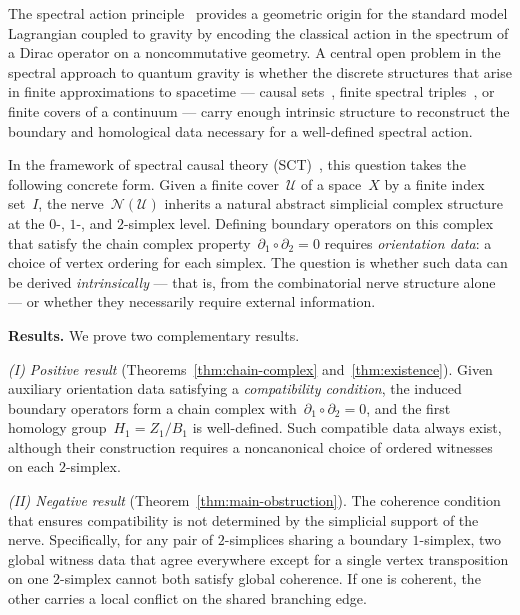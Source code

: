 \documentclass[11pt,a4paper]{article}
\theoremstyle{plain}
\theoremstyle{definition}
\theoremstyle{remark}
\newcommand{\cU}{\mathcal{U}}
\newcommand{\cN}{\mathcal{N}}
\begin{document}
The spectral action principle~\cite{Chamseddine:1996zu,Chamseddine:2006ep}
provides a geometric origin for the standard model Lagrangian coupled to
gravity by encoding the classical action in the spectrum of a Dirac operator
on a noncommutative geometry. A central open problem in the spectral
approach to quantum gravity is whether the discrete structures that arise
in finite approximations to spacetime --- causal sets~\cite{Bombelli:1987aa,
Sorkin:2003bx}, finite spectral triples~\cite{Connes:1994yd,
vanSuijlekom:2014pya}, or finite covers of a continuum --- carry enough
intrinsic structure to reconstruct the boundary and homological data
necessary for a well-defined spectral action.

In the framework of spectral causal theory
(SCT)~\cite{Alfyorov:2026ff,Alfyorov:2026ss,Alfyorov:2026ct},
this question takes the following concrete form.
Given a finite cover~$\cU$ of a space~$X$ by a finite index set~$I$,
the nerve~$\cN(\cU)$ inherits a natural abstract simplicial
complex structure at the $0$-, $1$-, and $2$-simplex level. Defining
boundary operators on this complex that satisfy the chain complex
property~$\partial_1 \circ \partial_2 = 0$ requires \emph{orientation data}:
a choice of vertex ordering for each simplex. The question is whether
such data can be derived \emph{intrinsically} --- that is, from the
combinatorial nerve structure alone --- or whether they necessarily
require external information.

\medskip

\noindent\textbf{Results.} We prove two complementary results.

\smallskip
\noindent\emph{(I) Positive result} (Theorems~\ref{thm:chain-complex}
and~\ref{thm:existence}). Given auxiliary orientation data satisfying a
\emph{compatibility condition}, the induced boundary operators form a chain
complex with~$\partial_1 \circ \partial_2 = 0$, and the first homology
group~$H_1 = Z_1 / B_1$ is well-defined. Such compatible data always exist,
although their construction requires a noncanonical choice of ordered
witnesses on each $2$-simplex.

\smallskip
\noindent\emph{(II) Negative result} (Theorem~\ref{thm:main-obstruction}).
The coherence condition that ensures compatibility is not determined by the
simplicial support of the nerve. Specifically, for any pair of $2$-simplices
sharing a boundary $1$-simplex, two global witness data that agree everywhere
except for a single vertex transposition on one $2$-simplex cannot both
satisfy global coherence. If one is coherent, the other carries a local
conflict on the shared branching edge.
\end{document}
